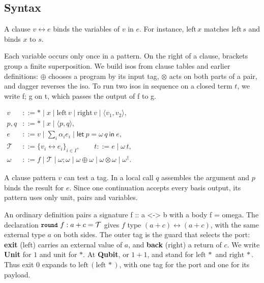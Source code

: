 \documentclass[acmsmall,screen,review,anonymous,nonacm]{acmart}
\newcommand{\storyinlinekwface}{\storyinlineface\bfseries}}
\newcommand{\storyinlineface}{\small\ttfamily}
\newcommand{\storyinlinekwface}{\small\ttfamily\bfseries}
\newcommand{\kw}[1]{\textnormal{\storyinlinekwface #1}}
\newcommand{\code}[1]{\textnormal{\storyinlineface #1}}
\numberwithin{equation}{section}
\begin{document}
\subsection{Syntax}

A clause $v\leftrightarrow e$ binds the variables of $v$ in $e$. For instance, $\mathrm{left}\,x$ matches $\mathrm{left}\,s$
and binds $x$ to $s$.

Each variable occurs only once in a pattern. On the right of a clause, brackets group a finite superposition. We build isos from clause tables and earlier definitions: $\oplus$ chooses a program by its input tag, $\otimes$ acts on both parts of a pair, and dagger reverses the iso. To run two isos in sequence on a closed term $t$, we write \code{f; g on t}, which passes the output of \code{f} to \code{g}.

\par\smallskip\noindent\begin{minipage}[c]{.53\linewidth}\centering
$\displaystyle \begin{aligned}
v&::=*\mid x\mid\mathrm{left}\,v\mid\mathrm{right}\,v\mid\langle v_1,v_2\rangle,\\
p,q&::=*\mid x\mid\langle p,q\rangle,\\
e&::=v\mid\textstyle\sum_i\alpha_i e_i
       \mid\mathsf{let}\ p=\omega\,q\ \mathsf{in}\ e,\\
\mathcal T&::=\{v_i\leftrightarrow e_i\}_{i\in I},
       \qquad t::=e\mid\omega\,t,\\
\omega&::=f\mid\mathcal T\mid\omega;\omega
       \mid\omega\oplus\omega\mid\omega\otimes\omega
       \mid\omega^\dagger.
\end{aligned}$
\end{minipage}\hfill\begin{minipage}[c]{.45\linewidth}
A clause pattern $v$ can test a tag. In a local call $q$ assembles the argument and $p$ binds the result for $e$. Since one continuation accepts every basis output, its pattern uses only unit, pairs and variables.
\end{minipage}\par\smallskip


An ordinary definition pairs a signature
\code{f :: a <-> b} with a body \code{f = omega}.
The declaration $\kw{round}\ f:a+c=\mathcal T$ gives $f$ type
$(a+c)\leftrightarrow(a+c)$, with the same external type $a$ on both sides.
The outer tag is the guard that selects the port: \kw{exit} ($\mathrm{left}$) carries an external
value of $a$, and \kw{back} ($\mathrm{right}$) a return of $c$. We write \kw{Unit}
for $1$ and \code{unit} for $*$. At \kw{Qubit}, or $1+1$, \code{0} and \code{1}
stand for $\mathrm{left}\,*$ and $\mathrm{right}\,*$. Thus \code{exit 0} expands
to $\mathrm{left}\,(\mathrm{left}\,*)$, with one tag for the port and one for its payload.
\end{document}
